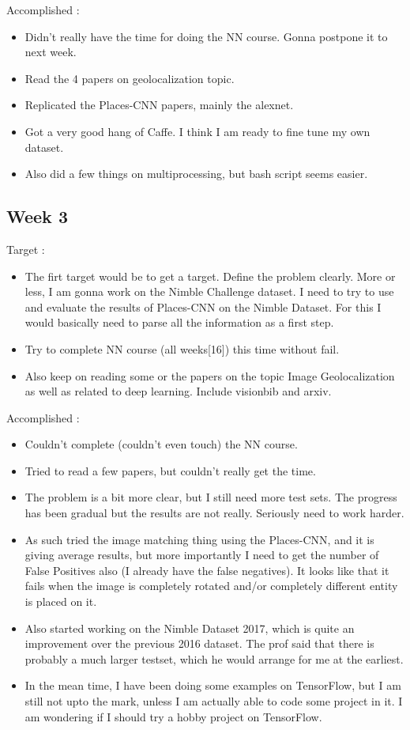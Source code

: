 \documentclass{article}
\begin{document}
Accomplished :
\begin{itemize}
\item Didn't really have the time for doing the NN course. Gonna postpone it to next week.
\item Read the 4 papers on geolocalization topic.
\item Replicated the Places-CNN papers, mainly the alexnet.
\item Got a very good hang of Caffe. I think I am ready to fine tune my own dataset.
\item Also did a few things on multiprocessing, but bash script seems easier.
\end{itemize}

\subsection{Week 3}
Target :
\begin{itemize}
\item The firt target would be to get a target. Define the problem clearly. More or less, I am gonna work on the Nimble Challenge dataset. I need to try to use and evaluate the results of Places-CNN on the Nimble Dataset. For this I would basically need to parse all the information as a first step.
\item Try to complete NN course (all weeks[16]) this time without fail.
\item Also keep on reading some or the papers on the topic Image Geolocalization as well as related to deep learning. Include visionbib and arxiv.
\end{itemize}

Accomplished :
\begin{itemize}
\item Couldn't complete (couldn't even touch) the NN course.
\item Tried to read a few papers, but couldn't really get the time.
\item The problem is a bit more clear, but I still need more test sets. The progress has been gradual but the results are not really. Seriously need to work harder.
\item As such tried the image matching thing using the Places-CNN, and it is giving average results, but more importantly I need to get the number of False Positives also (I already have the false negatives). It looks like that it fails when the image is completely rotated and/or completely different entity is placed on it.
\item Also started working on the Nimble Dataset 2017, which is quite an improvement over the previous 2016 dataset. The prof said that there is probably a much larger testset, which he would arrange for me at the earliest.
\item In the mean time, I have been doing some examples on TensorFlow, but I am still not upto the mark, unless I am actually able to code some project in it. I am wondering if I should try a hobby project on TensorFlow.
\end{itemize}
\end{document}
